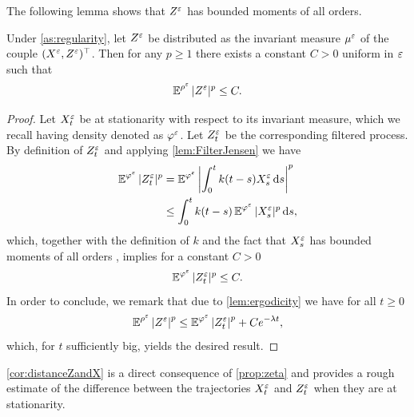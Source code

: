 \documentclass[review,onefignum,onetabnum]{siamonline190516}
\begin{document}
\begin{appendices}
The following lemma shows that $Z^\varepsilon$ has bounded moments of all orders.
\begin{lemma} \label{lem:bounded_momentZ}
	Under \cref{as:regularity}, let $Z^\varepsilon$ be distributed as the invariant measure $\mu^\varepsilon$ of the couple $(X^\varepsilon, Z^\varepsilon)^\top$. Then for any $p \geq 1$ there exists a constant $C > 0$ uniform in $\varepsilon$ such that 
	\begin{equation}
	\operatorname{\mathbb{E}}^{\rho^\varepsilon}|Z^\varepsilon|^p \le C.
	\end{equation}
\end{lemma}
\begin{proof} Let $X_t^\varepsilon$ be at stationarity with respect to its invariant measure, which we recall having density denoted as $\varphi^\varepsilon$. Let $Z_t^\varepsilon$ be the corresponding filtered process. By definition of $Z^\varepsilon_t$ and applying \cref{lem:FilterJensen} we have
	\begin{equation}
	\begin{aligned}
	\operatorname{\mathbb{E}}^{\varphi^\varepsilon} |Z_t^\varepsilon|^p &= \operatorname{\mathbb{E}}^{\varphi^\varepsilon} \left| \int_0^t k(t-s) X_s^\varepsilon \,\mathrm{d} s \right|^p \\
	&\leq \int_0^t k(t - s) \operatorname{\mathbb{E}}^{\varphi^\varepsilon} |X_s^\varepsilon|^p \,\mathrm{d} s,
	\end{aligned}
	\end{equation}
	which, together with the definition of $k$ and the fact that $X_s^\varepsilon$ has bounded moments of all orders \cite[Corollary 5.4]{PaS07}, implies for a constant $C>0$
	\begin{equation}
	\operatorname{\mathbb{E}}^{\varphi^\varepsilon}|Z_t^\varepsilon|^p \le C.
	\end{equation}
	In order to conclude, we remark that due to \cref{lem:ergodicity} we have for all $t \geq 0$
	\begin{equation}
	\operatorname{\mathbb{E}}^{\rho^\varepsilon} \left\lvert Z^\varepsilon\right\rvert^p \leq \operatorname{\mathbb{E}}^{\varphi^\varepsilon}\left\lvert Z_t^\varepsilon\right\rvert^p + C e^{-\lambda t},
	\end{equation}
	which, for $t$ sufficiently big, yields the desired result.
\end{proof}


\cref{cor:distanceZandX} is a direct consequence of \cref{prop:zeta} and provides a rough estimate of the difference between the trajectories $X_t^\varepsilon$ and $Z_t^\varepsilon$ when they are at stationarity.


\end{appendices}
\end{document}
